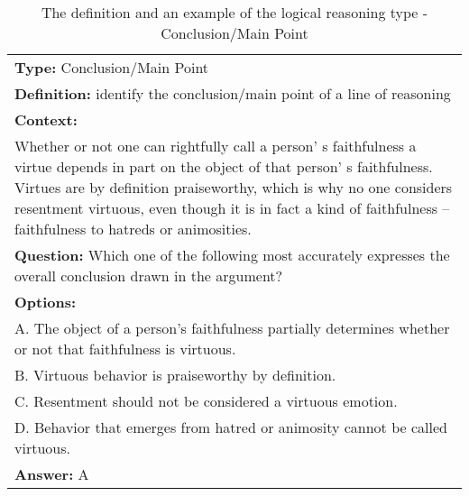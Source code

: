 \documentclass{article} \usepackage{iclr2020_conference,times}
\begin{document}
\begin{table}
	\small
	\centering
	\caption{The definition and an example of the logical reasoning type - Conclusion/Main Point}
	\begin{tabular}{|p{}|}
		\hline
		{\bf Type: } Conclusion/Main Point\\
		{\bf Definition: }identify the conclusion/main point of a line of reasoning\\
		\hline
        \textbf{Context: }\\
        Whether or not one can rightfully call a person' s faithfulness a virtue depends in part on the object of that person' s faithfulness. Virtues are by definition praiseworthy, which is why no one considers resentment virtuous, even though it is in fact a kind of faithfulness -- faithfulness to hatreds or animosities.\\
        \textbf{Question: }Which one of the following most accurately expresses the overall conclusion drawn in the argument?\\
        \textbf{Options: }\\
        A. The object of a person's faithfulness partially determines whether or not that faithfulness is virtuous.\\
        B. Virtuous behavior is praiseworthy by definition.\\
        C. Resentment should not be considered a virtuous emotion.\\
        D. Behavior that emerges from hatred or animosity cannot be called virtuous.\\
        \textbf{Answer: }A\\
		\hline
	\end{tabular}
	\label{tab:conclusion}
\end{table}
\end{document}
